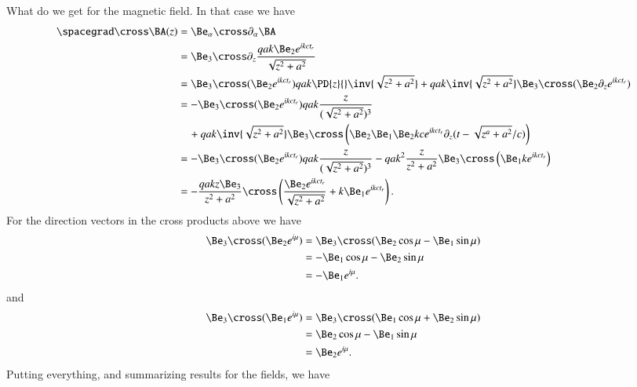 {What do we get for the magnetic field.  In that case we have
%
\begin{equation}\label{eqn:relativisticElectrodynamicsExamReflection:1190}
\begin{aligned}
\spacegrad \cross \BA(z)
&=
\Be_\alpha \cross \partial_\alpha \BA \\
&=
\Be_3 \cross \partial_z \frac{q a k \Be_2 e^{i k c t_r} }{\sqrt{z^2 + a^2}}  \\
&=
\Be_3 \cross (\Be_2 e^{i  k c t_r} ) q a  k \PD{z}{} \inv{\sqrt{z^2 + a^2}}
+
q a  k \inv{\sqrt{z^2 + a^2}} \Be_3 \cross (\Be_2 \partial_z e^{i  k c t_r} ) \\
&=
-\Be_3 \cross (\Be_2 e^{i  k c t_r} ) q a  k \frac{z}{(\sqrt{z^2 + a^2})^3} \\
&\quad +
q a  k \inv{\sqrt{z^2 + a^2}} \Be_3 \cross \left( \Be_2 \Be_1 \Be_2 k c e^{i  k c t_r} \partial_z ( t - \sqrt{z^a + a^2}/c ) \right) \\
&=
-\Be_3 \cross (\Be_2 e^{i  k c t_r} ) q a  k \frac{z}{(\sqrt{z^2 + a^2})^3}
-
q a  k^2 \frac{z}{z^2 + a^2} \Be_3 \cross \left( \Be_1 k e^{i  k c t_r} \right) \\
&=
-\frac{q a k z \Be_3}{z^2 + a^2} \cross \left(
\frac{ \Be_2 e^{i k c t_r} }{\sqrt{z^2 + a^2}} + k \Be_1 e^{i k c t_r}
\right).
\end{aligned}
\end{equation}
%
For the direction vectors in the cross products above we have
%
\begin{equation}\label{eqn:relativisticElectrodynamicsExamReflection:1210}
\begin{aligned}
\Be_3 \cross (\Be_2 e^{i \mu})
&=
\Be_3 \cross (\Be_2 \cos\mu - \Be_1 \sin\mu) \\
&=
-\Be_1 \cos\mu - \Be_2 \sin\mu \\
&=
-\Be_1 e^{i \mu}.
\end{aligned}
\end{equation}
%
and
%
\begin{equation}\label{eqn:relativisticElectrodynamicsExamReflection:1230}
\begin{aligned}
\Be_3 \cross (\Be_1 e^{i \mu})
&=
\Be_3 \cross (\Be_1 \cos\mu + \Be_2 \sin\mu) \\
&=
\Be_2 \cos\mu - \Be_1 \sin\mu \\
&=
\Be_2 e^{i \mu}.
\end{aligned}
\end{equation}
%
Putting everything, and summarizing results for the fields, we have
%
\begin{equation}\label{eqn:relativisticElectrodynamicsExamReflection:250}

\end{equation}}
